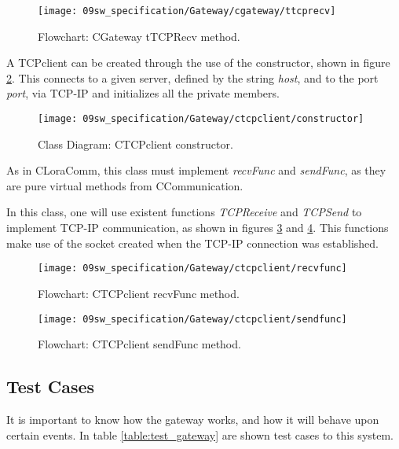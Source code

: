 \begin{figure}[H]
	\centering
	\texttt{[image: 09sw\_specification/Gateway/cgateway/ttcprecv]}
	\caption{Flowchart: CGateway tTCPRecv method.}
	\label{fig:gwtTCPRecv}
\end{figure}

\clearpage
{}

A TCPclient can be created through the use of the constructor, shown in figure \ref{fig:TCPclientconstructor}. This connects to a given server, defined by the string \textit{host}, and to the port \textit{port}, via TCP-IP and initializes all the private members.

\begin{figure}[H]
	\centering
	\texttt{[image: 09sw\_specification/Gateway/ctcpclient/constructor]}
	\caption{Class Diagram: CTCPclient constructor.}
	\label{fig:TCPclientconstructor}
\end{figure}

As in CLoraComm, this class must implement \textit{recvFunc} and \textit{sendFunc}, as they are pure virtual methods from CCommunication. 

In this class, one will use existent functions \textit{TCPReceive} and \textit{TCPSend} to implement TCP-IP communication, as shown in figures \ref{fig:TCPclientrecvfunc} and \ref{fig:TCPclientsendfunc}. This functions make use of the socket created when the TCP-IP connection was established.

\begin{figure}[H]
	\centering
	\texttt{[image: 09sw\_specification/Gateway/ctcpclient/recvfunc]}
	\caption{Flowchart: CTCPclient recvFunc method.}
	\label{fig:TCPclientrecvfunc}
\end{figure}

\begin{figure}[H]
	\centering
	\texttt{[image: 09sw\_specification/Gateway/ctcpclient/sendfunc]}
	\caption{Flowchart: CTCPclient sendFunc method.}
	\label{fig:TCPclientsendfunc}
\end{figure}

\clearpage
\subsection{Test Cases}
It is important to know how the gateway works, and how it will behave upon certain events. In table \ref{table:test_gateway} are shown test cases to this system.

